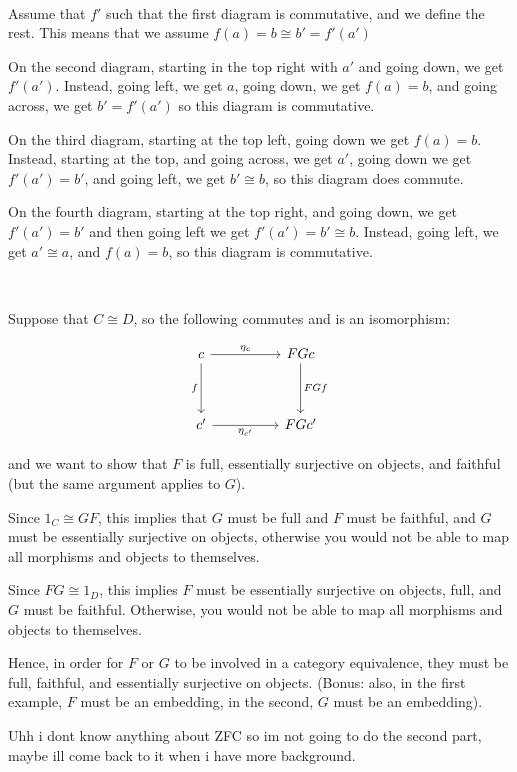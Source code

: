 \documentclass{article}
\begin{document}
\begin{customproof}
\

Assume that $f'$ such that the first diagram is commutative, and we define the rest. This means that we assume $f(a) = b \cong b' = f'(a')$

On the second diagram, starting in the top right with $a'$ and going down, we get $f'(a')$. Instead, going left, we get $a$, going down, we get $f(a) = b$, and going across, we get $b' = f'(a')$ so this diagram is commutative.

On the third diagram, starting at the top left, going down we get $f(a) = b$. Instead, starting at the top, and going across, we get $a'$, going down we get $f'(a') = b'$, and going left, we get $b' \cong b$, so this diagram does commute.

On the fourth diagram, starting at the top right, and going down, we get $f'(a') = b'$ and then going left we get $f'(a') = b' \cong b$. Instead, going left, we get $a' \cong a$, and $f(a) = b$, so this diagram is commutative.
\end{customproof}

\begin{customproof}
\

Suppose that $C \cong D$, so the following commutes and is an isomorphism:

\[\begin{tikzcd}
	c &&  FGc\\
    \\
    c' &&  FGc'
    \arrow[ from=1-1, to=1-3, "\eta_c"]
    \arrow[ from=1-3, to=3-3, "FGf"]
    \arrow[from=1-1, to=3-1, "f"']
    \arrow[from=3-1, to=3-3, "\eta_{c'}"']
\end{tikzcd}\]

and we want to show that $F$ is full, essentially surjective on objects, and faithful (but the same argument applies to $G$).

Since $1_C \cong GF$, this implies that $G$ must be full and $F$ must be faithful, and $G$ must be essentially surjective on objects, otherwise you would not be able to map all morphisms and objects to themselves.

Since $FG \cong 1_D$, this implies $F$ must be essentially surjective on objects, full, and $G$ must be faithful. Otherwise, you would not be able to map all morphisms and objects to themselves.

Hence, in order for $F$ or $G$ to be involved in a category equivalence, they must be full, faithful, and essentially surjective on objects. (Bonus: also, in the first example, $F$ must be an embedding, in the second, $G$ must be an embedding).

Uhh i dont know anything about ZFC so im not going to do the second part, maybe ill come back to it when i have more background.
\end{customproof}
\end{document}
